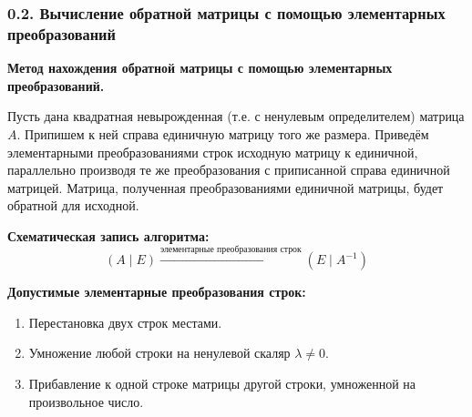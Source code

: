 \subsubsection*{0.2. Вычисление обратной матрицы с помощью элементарных преобразований}

\noindent\textbf{Метод нахождения обратной матрицы с помощью элементарных преобразований.}

Пусть дана квадратная невырожденная (т.е. с ненулевым определителем) матрица $A$. Припишем к ней справа единичную матрицу того же размера. Приведём элементарными преобразованиями строк исходную матрицу к единичной, параллельно производя те же преобразования с приписанной справа единичной матрицей. Матрица, полученная преобразованиями единичной матрицы, будет обратной для исходной.

\noindent\textbf{Схематическая запись алгоритма:}
\[
(A \mid E) \xrightarrow{\text{элементарные преобразования строк}} (E \mid A^{-1})
\]

\noindent\textbf{Допустимые элементарные преобразования строк:}
\begin{enumerate}
    \item Перестановка двух строк местами.
    \item Умножение любой строки на ненулевой скаляр $\lambda \neq 0$.
    \item Прибавление к одной строке матрицы другой строки, умноженной на произвольное число.
\end{enumerate}


